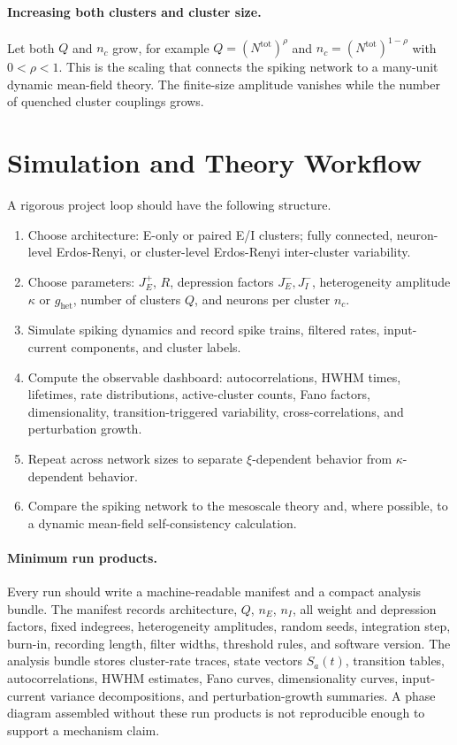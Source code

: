 \paragraph{Increasing both clusters and cluster size.}
Let both \(Q\) and \(n_c\) grow, for example
\(Q=(N^{\mathrm{tot}})^\rho\) and
\(n_c=(N^{\mathrm{tot}})^{1-\rho}\) with \(0<\rho<1\). This is the scaling that
connects the spiking network to a many-unit dynamic mean-field theory. The
finite-size amplitude vanishes while the number of quenched cluster couplings
grows.

\section{Simulation and Theory Workflow}
\label{sec:ch10-workflow}

A rigorous project loop should have the following structure.
\begin{enumerate}
    \item Choose architecture: E-only or paired E/I clusters; fully connected,
    neuron-level Erdos-Renyi, or cluster-level Erdos-Renyi inter-cluster
    variability.
    \item Choose parameters: \(J_E^+\), \(R\), depression factors
    \(J_E^-,J_I^-\), heterogeneity amplitude \(\kappa\) or \(g_{\mathrm{het}}\),
    number of clusters \(Q\), and neurons per cluster \(n_c\).
    \item Simulate spiking dynamics and record spike trains, filtered rates,
    input-current components, and cluster labels.
    \item Compute the observable dashboard: autocorrelations, HWHM times,
    lifetimes, rate distributions, active-cluster counts, Fano factors,
    dimensionality, transition-triggered variability, cross-correlations, and
    perturbation growth.
    \item Repeat across network sizes to separate \(\xi\)-dependent behavior
    from \(\kappa\)-dependent behavior.
    \item Compare the spiking network to the mesoscale theory and, where
    possible, to a dynamic mean-field self-consistency calculation.
\end{enumerate}

\paragraph{Minimum run products.}
Every run should write a machine-readable manifest and a compact analysis
bundle. The manifest records architecture, \(Q\), \(n_E\), \(n_I\), all weight
and depression factors, fixed indegrees, heterogeneity amplitudes, random
seeds, integration step, burn-in, recording length, filter widths, threshold
rules, and software version. The analysis bundle stores cluster-rate traces,
state vectors \(S_a(t)\), transition tables, autocorrelations, HWHM estimates,
Fano curves, dimensionality curves, input-current variance decompositions, and
perturbation-growth summaries. A phase diagram assembled without these run
products is not reproducible enough to support a mechanism claim.

